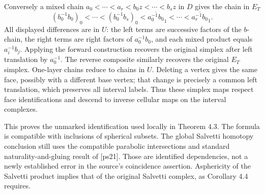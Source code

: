 \documentclass[10pt]{article}
\begin{document}
Conversely a mixed chain \(a_0<\cdots<a_r<b_0z<\cdots<b_sz\) in \(D\) gives the chain in \(E_T\) \[(b_0^{-1}b_0)_0<\cdots<(b_0^{-1}b_s)_0
 <\overline{a_0^{-1}b_0}_1<\cdots<
       \overline{a_r^{-1}b_0}_1 .\] All displayed differences are in \(U\): the left terms are successive factors of the \(b\)-chain, the right terms are right factors of \(a_0^{-1}b_0\), and each mixed product equals \(a_i^{-1}b_j\). Applying the forward construction recovers the original simplex after left translation by \(a_0^{-1}\). The reverse composite similarly recovers the original \(E_T\) simplex. One-layer chains reduce to chains in \(U\). Deleting a vertex gives the same face, possibly with a different base vertex; that change is precisely a common left translation, which preserves all interval labels. Thus these simplex maps respect face identifications and descend to inverse cellular maps on the interval complexes.\par
This proves the unmarked identification used locally in Theorem 4.3. The formula is compatible with inclusions of spherical subsets. The global Salvetti homotopy conclusion still uses the compatible parabolic intersections and standard naturality-and-gluing result of [ps21]. Those are identified dependencies, not a newly established error in the source’s coincidence assertion. Asphericity of the Salvetti product implies that of the original Salvetti complex, as Corollary 4.4 requires.\par
\end{document}
